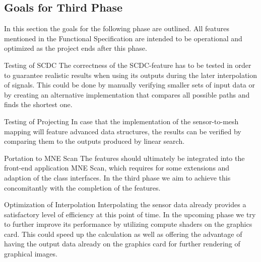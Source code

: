 \subsection{Goals for Third Phase}
In this section the goals for the following phase are outlined. All features mentioned in the Functional Specification are intended to be operational and optimized as the project ends after this phase.


\begin{aims}
	\item[\hspace*{11mm}Testing of SCDC] The correctness of the SCDC-feature has to be tested in order to guarantee realistic results when using its outputs during the later interpolation of signals. This could be done by manually verifying smaller sets of input data or by creating an alternative implementation that compares all possible paths and finds the shortest one.
\end{aims}

\begin{aims}
\item[\hspace*{11mm}Testing of Projecting] In case that the implementation of the sensor-to-mesh mapping will feature advanced data structures, the results can be verified by comparing them to the outputs produced by linear search.
\end{aims}


\begin{aims}
\item[\hspace*{11mm}Portation to MNE Scan] 
The features should ultimately be integrated into the front-end application MNE Scan, which requires for some extensions and adaption of the class interfaces. In the third phase we aim to achieve this concomitantly with the completion of the features.
\end{aims}

\begin{aims}
	\item[\hspace*{11mm}Optimization of Interpolation] 
	Interpolating the sensor data already provides a satisfactory level of efficiency at this point of time. In the upcoming phase we try to further improve its performance by utilizing compute shaders on the graphics card. This could speed up the calculation as well as offering the advantage of having the output data already on the graphics card for further rendering of graphical images.
\end{aims}

